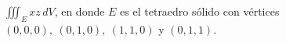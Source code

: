 \item $\iiint_E xz \, dV$, en donde $E$ es el tetraedro sólido con vértices $(0, 0, 0), \ (0, 1, 0), \ (1, 1, 0)$ y $(0, 1, 1)$.
